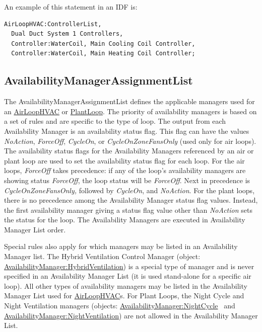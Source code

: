 An example of this statement in an IDF is:

\begin{lstlisting}
AirLoopHVAC:ControllerList,
  Dual Duct System 1 Controllers,
  Controller:WaterCoil, Main Cooling Coil Controller,
  Controller:WaterCoil, Main Heating Coil Controller;
\end{lstlisting}

\subsection{AvailabilityManagerAssignmentList}\label{availabilitymanagerassignmentlist}

The AvailabilityManagerAssignmentList defines the applicable managers used for an \hyperref[airloophvac]{AirLoopHVAC} or \hyperref[plantloop]{PlantLoop}. The priority of availability managers is based on a set of rules and are specific to the type of loop. The output from each Availability Manager is an availability status flag. This flag can have the values \emph{NoAction}, \emph{ForceOff}, \emph{CycleOn}, or \emph{CycleOnZoneFansOnly} (used only for air loops). The availability status flags for the Availability Managers referenced by an air or plant loop are used to set the availability status flag for each loop. For the air loops, \emph{ForceOff} takes precedence: if any of the loop's availability managers are showing status \emph{ForceOff}, the loop status will be \emph{ForceOff}. Next in precedence is \emph{CycleOnZoneFansOnly,} followed by \emph{CycleOn}, and \emph{NoAction}. For the plant loops, there is no precedence among the Availability Manager status flag values. Instead, the first availability manager giving a status flag value other than \emph{NoAction} sets the status for the loop. The Availability Managers are executed in Availability Manager List order.

Special rules also apply for which managers may be listed in an Availability Manager list. The Hybrid Ventilation Control Manager (object: \hyperref[availabilitymanagerhybridventilation]{AvailabilityManager:HybridVentilation}) is a special type of manager and is never specified in an Availability Manager List (it is used stand-alone for a specific air loop). All other types of availability managers may be listed in the Availability Manager List used for \hyperref[airloophvac]{AirLoopHVAC}s. For Plant Loops, the Night Cycle and Night Ventilation managers (objects: \hyperref[availabilitymanagernightcycle]{AvailabilityManager:NightCycle} ~and \hyperref[availabilitymanagernightventilation]{AvailabilityManager:NightVentilation}) are not allowed in the Availability Manager List.

